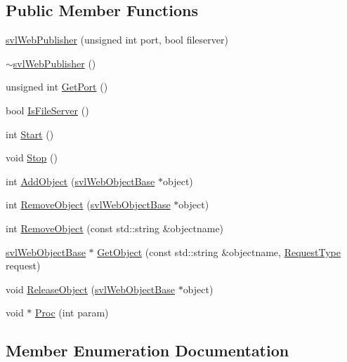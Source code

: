 \subsection*{Public Member Functions}
\begin{DoxyCompactItemize}
\item 
\hyperlink{classsvl_web_publisher_a5e3a0b9676e602ded1e24a2ee7d55f3d}{svl\+Web\+Publisher} (unsigned int port, bool fileserver)
\item 
\hyperlink{classsvl_web_publisher_a3ff9e3e258cef5489d00b62c5b58afde}{$\sim$svl\+Web\+Publisher} ()
\item 
unsigned int \hyperlink{classsvl_web_publisher_a7eb47e2305909509848a8d00a769dfc4}{Get\+Port} ()
\item 
bool \hyperlink{classsvl_web_publisher_a21d7d1cff2a2c5a06172c5f0c20a0b18}{Is\+File\+Server} ()
\item 
int \hyperlink{classsvl_web_publisher_a96c4c669dfde84cb6c53b09c9b017d86}{Start} ()
\item 
void \hyperlink{classsvl_web_publisher_ababd2877a25c15590c3361fec7dedad8}{Stop} ()
\item 
int \hyperlink{classsvl_web_publisher_a34610d8e3c419130f3edc8dc74c28d1a}{Add\+Object} (\hyperlink{classsvl_web_object_base}{svl\+Web\+Object\+Base} $\ast$object)
\item 
int \hyperlink{classsvl_web_publisher_abe521dc2134384e6ce1b01b3816df5ed}{Remove\+Object} (\hyperlink{classsvl_web_object_base}{svl\+Web\+Object\+Base} $\ast$object)
\item 
int \hyperlink{classsvl_web_publisher_aaef372cedb9416b869d64a7b708e9f3a}{Remove\+Object} (const std\+::string \&objectname)
\item 
\hyperlink{classsvl_web_object_base}{svl\+Web\+Object\+Base} $\ast$ \hyperlink{classsvl_web_publisher_a62d6a013066d06aaab56bf4b979d5269}{Get\+Object} (const std\+::string \&objectname, \hyperlink{classsvl_web_publisher_a88f1268e9e8fc3b535e90fc8132643fd}{Request\+Type} request)
\item 
void \hyperlink{classsvl_web_publisher_afabb19c0d42fc41bd03e88ce0a366d4b}{Release\+Object} (\hyperlink{classsvl_web_object_base}{svl\+Web\+Object\+Base} $\ast$object)
\item 
void $\ast$ \hyperlink{classsvl_web_publisher_a1307a7c5aaac23d369be4725808ed63d}{Proc} (int param)
\end{DoxyCompactItemize}


\subsection{Member Enumeration Documentation}
\hypertarget{classsvl_web_publisher_a88f1268e9e8fc3b535e90fc8132643fd}{}
